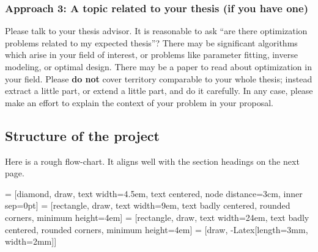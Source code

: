 \documentclass[12pt]{amsart}
\begin{document}
\subsubsection*{Approach 3: A topic related to your thesis (if you have one)}  Please talk to your thesis advisor.  It is reasonable to ask ``are there optimization problems related to my expected thesis''?  There may be significant algorithms which arise in your field of interest, or problems like parameter fitting, inverse modeling, or optimal design.  There may be a paper to read about optimization in your field.  Please \textbf{do not} cover territory comparable to your whole thesis; instead extract a little part, or extend a little part, and do it carefully.  In any case, please make an effort to explain the context of your problem in your proposal.


\newpage
\subsection*{Structure of the project}  Here is a rough flow-chart.  It aligns well with the section headings on the next page.

\bigskip

 = [diamond, draw,
    text width=4.5em, text centered, node distance=3cm, inner sep=0pt]
 = [rectangle, draw,
    text width=9em, text badly centered, rounded corners, minimum height=4em]
 = [rectangle, draw,
    text width=24em, text badly centered, rounded corners, minimum height=4em]
 = [draw, -{Latex[length=3mm, width=2mm]}]
\end{document}
